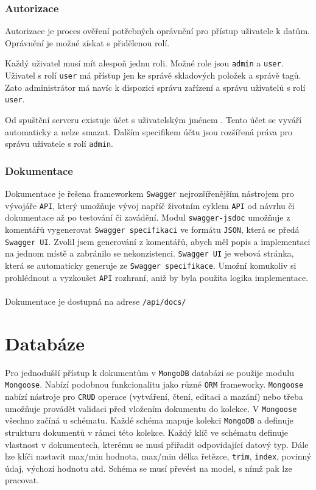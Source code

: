 \documentclass[czech,BP]{thesiskiv}
\begin{document}
	\subsubsection{Autorizace}
	Autorizace je proces ověření potřebných oprávnění pro přístup uživatele k datům. Oprávnění je možné získat s přidělenou rolí.
	
	Každý uživatel musí mít alespoň jednu roli. Možné role jsou \texttt{admin} a \texttt{user}. 
	Uživatel s rolí \texttt{user} má přístup jen ke správě skladových položek a správě tagů. 
	Zato administrátor má navíc k dispozici správu zařízení a správu uživatelů s rolí \texttt{user}.
	
	Od spuštění serveru existuje účet s uživatelským jménem .
	Tento účet se vyváří automaticky a nelze smazat. Dalším specifikem účtu jsou rozšířená práva pro správu uživatele s rolí \texttt{admin}.
	
	
\newpage	
	
	\subsubsection{Dokumentace}
	Dokumentace je řešena frameworkem \texttt{Swagger} nejrozšířenějším nástrojem pro vývojáře \texttt{API}, který umožňuje vývoj napříč životním cyklem \texttt{API} od návrhu či dokumentace až po testování či zavádění.	
	Modul \texttt{swagger-jsdoc} umožňuje z komentářů vygenerovat \texttt{Swagger specifikaci} ve formátu \texttt{JSON}, která se předá  \texttt{Swagger UI}. 
	Zvolil jsem generování z komentářů, abych měl popis a implementaci na jednom místě a zabránilo se nekonzistenci.
	\texttt{Swagger UI} je webová stránka, která se automaticky generuje ze \texttt{Swagger specifikace}. Umožní komukoliv si prohlédnout a vyzkoušet \texttt{API} rozhraní, aniž by byla použita logika implementace.
	\\\\
	Dokumentace je dostupná na adrese \texttt{/api/docs/}



	\section{Databáze}
	Pro jednodušší přístup k dokumentům v \texttt{MongoDB} databázi se použije modulu \texttt{Mongoose}. Nabízí podobnou funkcionalitu jako různé \texttt{ORM} frameworky.
	\texttt{Mongoose} nabízí nástroje pro \texttt{CRUD} operace (vytváření, čtení, editaci a mazání) nebo třeba umožňuje provádět validaci před vložením dokumentu do kolekce. V \texttt{Mongoose} všechno začíná u schématu. Každé schéma mapuje kolekci \texttt{MongoDB} a definuje strukturu dokumentů v rámci této kolekce. Každý klíč ve schématu definuje vlastnost v dokumentech, kterému se musí přiřadit odpovídající datový typ. Dále lze klíči nastavit max/min hodnota, max/min délka řetězce, \texttt{trim}, \texttt{index}, povinný údaj, výchozí hodnotu atd. Schéma se musí převést na model, s nímž pak lze pracovat.
	
\end{document}
